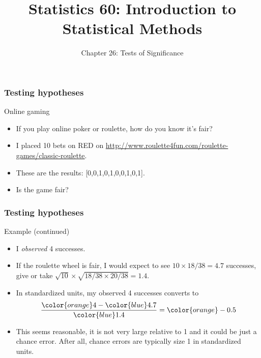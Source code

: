 \documentclass[handout]{beamer}
\title{Statistics 60: Introduction to Statistical Methods}
\subtitle{Chapter 26: Tests of Significance}
\author{}%
\begin{document}
   \begin{frame}
   \titlepage
   \end{frame}


   \begin{frame} \frametitle{Testing hypotheses}

   \begin{block}
   {Online gaming}
   \begin{itemize}
   \item If you play online poker or roulette, how do you know it's fair?

   \item I placed 10 bets on {\color{red} RED} on
   \href{http://www.roulette4fun.com/roulette-games/classic-roulette}{http://www.roulette4fun.com/roulette-games/classic-roulette}.

   \item These are the results: [0,0,1,0,1,0,0,1,0,1].

   \item Is the game fair?

   \end{itemize}
   \end{block}
   \end{frame}


   \begin{frame} \frametitle{Testing hypotheses}

   \begin{block}
   {Example (continued)}
   \begin{itemize}
   \item I {\em observed} 4 successes.
   \item If the roulette wheel is fair,
   I would expect to see $10 \times 18/ 38=4.7$ successes, give or take
   $\sqrt{10} \times \sqrt{18/38 \times 20/38}=1.4$.

   \item In standardized units, my observed 4 successes converts to
   $$
   \frac{{\color{orange} 4} - {\color{blue} 4.7}}{{\color{blue} 1.4}} = {\color{orange} -0.5}
   $$

   \item This seems reasonable, it is not very large relative to 1 and it could
   be just a chance error. After all, chance errors are typically size 1 in standardized units.


   \end{itemize}
   \end{block}
   \end{frame}
\end{document}
